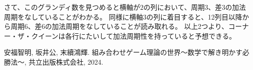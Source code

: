 \documentclass[uplatex,dvipdfmx,a4paper,10pt]{jsarticle}
\theoremstyle{definition}
\begin{document}
さて、このグランディ数を見つめると横軸が\(2\)の列において、周期3、差3の加法周期をなしていることがわかる。
同様に横軸\(3\)の列に着目すると、12列目以降から周期6、差6の加法周期をなしていることが読み取れる。
以上2つより、コーナー・ザ・クイーンは各行にたいして加法周期性を持っていると予想できる。

\begin{thebibliography}{99}
   安福智明, 坂井公, 末續鴻輝. 組み合わせゲーム理論の世界〜数学で解き明かす必勝法〜, 共立出版株式会社, 2024.
\end{thebibliography}

\appendix
\setcounter{figure}{0}
\setcounter{table}{0}
\renewcommand{\thetable}{\Alph{section}\arabic{table}}
\renewcommand{\thefigure}{\Alph{section}\arabic{figure}}
\makeatletter 
\newcommand{\section@cntformat}{付録 \thesection:\ }
\makeatother

    
\end{document}
